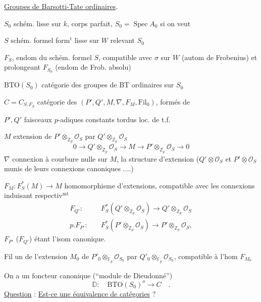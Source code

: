 \uline{Groupes de Barsotti-Tate ordinaires}.

$S_0$ schém. lisse sur $k$, corps parfait, $S_0=\operatorname{Spec} A_0$ si on veut

$S$ schém. formel form$^{\mathrm t}$ lisse sur $W$ relevant $S_0$

$F_S$, endom  du schém. formel $S$, compatible avec $\sigma$ sur $W$ (autom de Frobenius) et prolongeant $F_{S_0}$ (endom de Frob. absolu)

$\mathrm{BTO}(S_0)$ catégorie des groupes de BT ordinaires sur $S_0$

$C=C_{S,F_S}$ catégorie des   $(P',Q',M,\nabla,F_M,\mathrm{Fil}_0)$, formés de

$P',Q'$ faisceaux $p$-adiques constants tordus  loc.  de t.f. 

$M$ extension de $P'\otimes_{\mathbb Z_p}\mathcal O_S$ par $Q'\otimes_{\mathbb Z_p}\mathcal O_S$
\[
0\longrightarrow Q'\otimes_{\mathbb Z_p}\mathcal O_S\longrightarrow M\longrightarrow P'\otimes_{\mathbb Z_p}\mathcal O_S\longrightarrow0
\]
$\nabla$ connexion à courbure nulle sur $M$,   la structure d'extension ($Q'\otimes\mathcal O_S$ et $P'\otimes\mathcal O_S$ munis de leurs connexions canoniques ....)

$F_M:F_S^*(M)\longrightarrow M$ homomorphisme d'extensions, compatible avec les connexions induisant  respectiv$^{\mathrm{mt}}$
\[
\begin{aligned}
F_{Q'}:\quad& F_S^*(Q'\otimes_{\mathbb Z_p}\mathcal O_S)\longrightarrow Q'\otimes_{\mathbb Z_p}\mathcal O_S\\
p.F_{P'}:\quad& F_S^*(P'\otimes_{\mathbb Z_p}\mathcal O_S)\longrightarrow P'\otimes_{\mathbb Z_p}\mathcal O_S,
\end{aligned}
\]
$F_{P'}$ ($F_{Q'}$) étant l'isom canonique.

Fil un   de l'extension $M_0$ de $P'_0\otimes_{\mathbb F_p}\mathcal O_{S_0}$ par $Q'_0\otimes_{\mathbb F_p}\mathcal O_{S_0}$, compatible à l'hom $F_{M_0}$

On a un foncteur canonique (``module de Dieudonné'')
\[
\mathbb D:\quad\mathrm{BTO}(S_0)^o\longrightarrow C\quad .
\]
\uline{Question} : \uline{Est-ce une équivalence de catégories} ?

